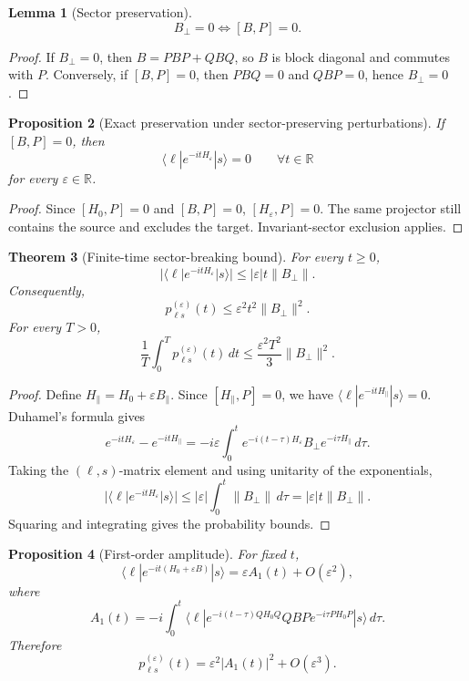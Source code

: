 \documentclass[11pt]{article}
\newtheorem{theorem}{Theorem}[section]
\newtheorem{proposition}[theorem]{Proposition}
\newtheorem{lemma}[theorem]{Lemma}
\theoremstyle{definition}
\newcommand{\R}{\mathbb R}
\begin{document}
\begin{lemma}[Sector preservation]
\[
B_\perp=0\Longleftrightarrow [B,P]=0.
\]
\end{lemma}

\begin{proof}
If $B_\perp=0$, then $B=PBP+QBQ$, so $B$ is block diagonal and commutes with $P$. Conversely, if $[B,P]=0$, then $PBQ=0$ and $QBP=0$, hence $B_\perp=0$.
\end{proof}

\begin{proposition}[Exact preservation under sector-preserving perturbations]
If $[B,P]=0$, then
\[
\langle \ell|e^{-itH_\varepsilon}|s\rangle=0\qquad \forall t\in\R
\]
for every $\varepsilon\in\R$.
\end{proposition}

\begin{proof}
Since $[H_0,P]=0$ and $[B,P]=0$, $[H_\varepsilon,P]=0$. The same projector still contains the source and excludes the target. Invariant-sector exclusion applies.
\end{proof}

\begin{theorem}[Finite-time sector-breaking bound]
For every $t\ge0$,
\[
|\langle \ell|e^{-itH_\varepsilon}|s\rangle|\le |\varepsilon|t\|B_\perp\|.
\]
Consequently,
\[
p^{(\varepsilon)}_{\ell s}(t)\le \varepsilon^2t^2\|B_\perp\|^2.
\]
For every $T>0$,
\[
\frac1T\int_0^T p^{(\varepsilon)}_{\ell s}(t)\,dt\le \frac{\varepsilon^2T^2}{3}\|B_\perp\|^2.
\]
\end{theorem}

\begin{proof}
Define $H_\parallel=H_0+\varepsilon B_\parallel$. Since $[H_\parallel,P]=0$, we have $\langle \ell|e^{-itH_\parallel}|s\rangle=0$. Duhamel's formula gives
\[
e^{-itH_\varepsilon}-e^{-itH_\parallel}=-i\varepsilon\int_0^t e^{-i(t-\tau)H_\varepsilon}B_\perp e^{-i\tau H_\parallel}\,d\tau.
\]
Taking the $(\ell,s)$-matrix element and using unitarity of the exponentials,
\[
|\langle \ell|e^{-itH_\varepsilon}|s\rangle|\le |\varepsilon|\int_0^t\|B_\perp\|\,d\tau=|\varepsilon|t\|B_\perp\|.
\]
Squaring and integrating gives the probability bounds.
\end{proof}

\begin{proposition}[First-order amplitude]
For fixed $t$,
\[
\langle \ell|e^{-it(H_0+\varepsilon B)}|s\rangle=\varepsilon A_1(t)+O(\varepsilon^2),
\]
where
\[
A_1(t)=-i\int_0^t \langle \ell|e^{-i(t-\tau)QH_0Q}QBP e^{-i\tau P H_0P}|s\rangle\,d\tau.
\]
Therefore
\[
p^{(\varepsilon)}_{\ell s}(t)=\varepsilon^2|A_1(t)|^2+O(\varepsilon^3).
\]
\end{proposition}
\end{document}
